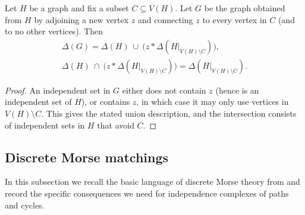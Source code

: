 \documentclass[12pt]{amsart}
\theoremstyle{plain}
\theoremstyle{definition}
\begin{document}

\begin{lem}\label{lem:partial-cone-complex}
Let $H$ be a graph and fix a subset $C\subseteq V(H)$. Let $G$ be the graph obtained from $H$ by
adjoining a new vertex $z$ and connecting $z$ to every vertex in $C$ (and to no other vertices).
Then
\begin{align*}
  \Delta(G) =  \Delta(H)\ \cup\ \bigl(z * \Delta(H|_{V(H)\setminus C})\bigr),\\
\Delta(H)\ \cap\ \bigl(z * \Delta(H|_{V(H)\setminus C})\bigr) =  \Delta(H|_{V(H)\setminus C}).  
\end{align*}

\end{lem}

\begin{proof}
An independent set in $G$ either does not contain $z$ (hence is an independent set of $H$), or
contains $z$, in which case it may only use vertices in $V(H)\setminus C$. This gives the stated
union description, and the intersection consists of independent sets in $H$ that avoid $C$.
\end{proof}



\subsection{Discrete Morse matchings}

In this subsection we recall the basic language of discrete Morse theory from \cite{Forman98} and record the specific
consequences we need for independence complexes of paths and cycles. 
\end{document}
